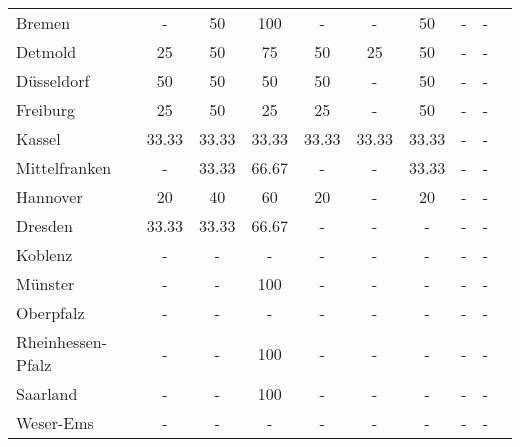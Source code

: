 \begin{table}[H]
\begin{tabularx}{\textwidth}{Xccccccccc}
            Bremen & - & 50 & 100 & - & - & 50 & - & - \\
            Detmold & 25 & 50 & 75 & 50 & 25 & 50 & - & - \\
            Düsseldorf & 50 & 50 & 50 & 50 & - & 50 & - & - \\
            Freiburg & 25 & 50 & 25 & 25 & - & 50 & - & - \\
            Kassel & 33.33 & 33.33 & 33.33 & 33.33 & 33.33 & 33.33 & - & - \\
            Mittelfranken & - & 33.33 & 66.67 & - & - & 33.33 & - & - \\
            Hannover & 20 & 40 & 60 & 20 & - & 20 & - & - \\
            Dresden & 33.33 & 33.33 & 66.67 & - & - & - & - & - \\
            Koblenz & - & - & - & - & - & - & - & - \\
            Münster & - & - & 100 & - & - & - & - & - \\
            Oberpfalz & - & - & - & - & - & - & - & - \\
            Rheinhessen-Pfalz & - & - & 100 & - & - & - & - & - \\
            Saarland & - & - & 100 & - & - & - & - & - \\
            Weser-Ems & - & - & - & - & - & - & - & - \\
        \bottomrule
    \end{tabularx}
\end{table}
    